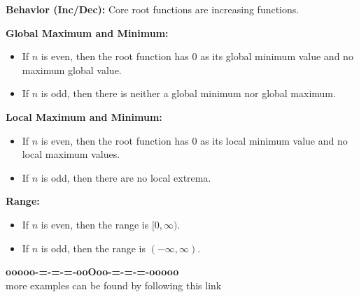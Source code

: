 \documentclass{ximera}
\begin{document}
\begin{explanation}
\textbf{Behavior (Inc/Dec):}  Core root functions are increasing functions.

\textbf{Global Maximum and Minimum:}  

\begin{itemize}
\item If $n$ is even, then the root function has $0$ as its global minimum value and no maximum global value.
\item If $n$ is odd, then there is neither a global minimum nor global maximum.
\end{itemize} 

\textbf{Local Maximum and Minimum:} 


\begin{itemize}
\item If $n$ is even, then the root function has $0$ as its local minimum value and no local maximum values.
\item If $n$ is odd, then there are no local extrema.
\end{itemize} 


\textbf{Range:} 


\begin{itemize}
\item If $n$ is even, then the range is $[0, \infty)$.
\item If $n$ is odd, then the range is $(-\infty, \infty)$.
\end{itemize} 

\end{explanation}































































\begin{center}
\textbf{\textcolor{green!50!black}{ooooo-=-=-=-ooOoo-=-=-=-ooooo}} \\

more examples can be found by following this link\\ 

\end{center}
\end{document}
